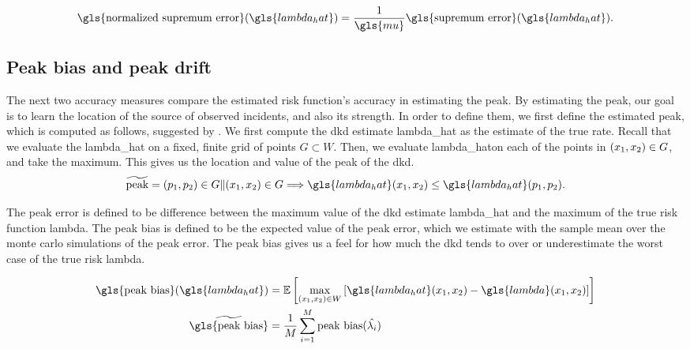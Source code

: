 \begin{equation}
\label{eq:normalized_supremum_error}
    \mbox{\gls{normalized supremum error}}(\gls{lambda_hat}) = 
        \frac{1}{\gls{mu}} \mbox{\gls{supremum error}}(\gls{lambda_hat}) \text{.}
\end{equation}

\subsection{Peak bias and peak drift}
\label{subsec:method:peak_bias}

The next two accuracy measures compare the estimated risk function's accuracy in estimating the peak.
By estimating the peak,
our goal is to learn the location of the source of observed incidents,
and also its strength.
In order to define them,
we first define the estimated peak,
which is computed as follows,
suggested by \citet{parzen1961mathematical}.
We first compute the \gls{dkd} estimate \gls{lambda_hat} as the estimate of the true rate.
Recall that we evaluate the \gls{lambda_hat} on a fixed, finite grid of points $G \subset W$.
Then,
we evaluate \gls{lambda_hat}\xvec on each of the points in $(x_1, x_2) \in G$, and take the maximum.
This gives us the location and value of the peak of the \gls{dkd}.
\begin{equation}
    \widetilde{\mbox{peak}} = (p_1, p_2) \in G \|%
        \xvec \in G \Longrightarrow \gls{lambda_hat}\xvec \leq \gls{lambda_hat}(p_1, p_2) \text{.}%
\end{equation}

The \gls{peak error} is defined to be difference between the maximum value of the \gls{dkd} estimate \gls{lambda_hat} and the maximum of the true risk function \gls{lambda}.
The \gls{peak bias} is defined to be the expected value of the \gls{peak error},
which we estimate with the sample mean over the monte carlo simulations of the \gls{peak error}.
The \gls{peak bias} gives us a feel for how much the \gls{dkd} tends to over or underestimate the worst case of the true risk \gls{lambda}.

\begin{align}
    \mbox{\gls{peak bias}}(\gls{lambda_hat})  & = \E \left[
                                \max_{(x_1,x_2) \in W} \left[
                                    {\gls{lambda_hat}\xvec} - \gls{lambda}\xvec
                                \right]
                            \right]
                            \\
    \widetilde{\mbox{\gls{peak bias}}} & = \frac{1}{M} \sum_{i=1}^{M} \mbox{peak bias}(\hat{\lambda_i})%
\end{align}

